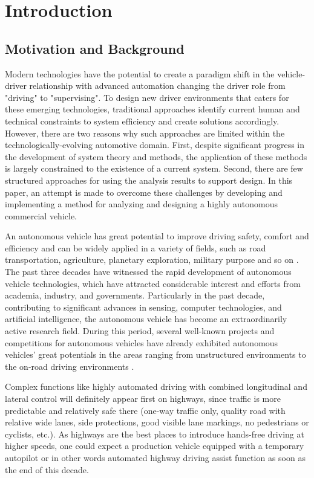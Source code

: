 \chapter{Introduction}


\section{Motivation and Background}


Modern technologies have the potential to create a paradigm shift in the vehicle-driver relationship with advanced automation changing the driver role from "driving" to "supervising". To design new driver environments that caters for these emerging technologies, traditional approaches identify current human and technical constraints to system efficiency and create solutions accordingly. However, there are two reasons why such approaches are limited within the technologically-evolving automotive domain. First, despite significant progress in the development of system theory and methods, the application of these methods is largely constrained to the existence of a current system. Second, there are few structured approaches for using the analysis results to support design. In this paper, an attempt is made to overcome these challenges by developing and implementing a method for analyzing and designing a highly autonomous commercial vehicle. 

An autonomous vehicle has great potential to improve driving safety, comfort and efficiency and can be widely applied in a variety of fields, such as road transportation, agriculture, planetary exploration, military purpose and so on \cite {WANG2015727}. The past three decades have witnessed the rapid development of autonomous vehicle technologies, which have attracted considerable interest and efforts from academia, industry, and governments. Particularly in the past decade, contributing to significant advances in sensing, computer technologies, and artificial intelligence, the autonomous vehicle has become an extraordinarily active research field. During this period, several well-known projects and competitions for autonomous vehicles have already exhibited autonomous vehicles' great potentials in the areas ranging from unstructured environments to the on-road driving environments \cite{AutonomousStructured} \cite{DrivingUrban2008}.


Complex functions like highly automated driving with combined longitudinal and lateral control will definitely appear first on highways, since traffic is more predictable and relatively safe there (one-way traffic only, quality road with relative wide lanes, side protections, good visible lane markings, no pedestrians or cyclists, etc.). As highways are the best places to introduce hands-free driving at higher speeds, one could expect a production vehicle equipped with a temporary autopilot or in other words automated highway driving assist function as soon as the end of this decade. 

